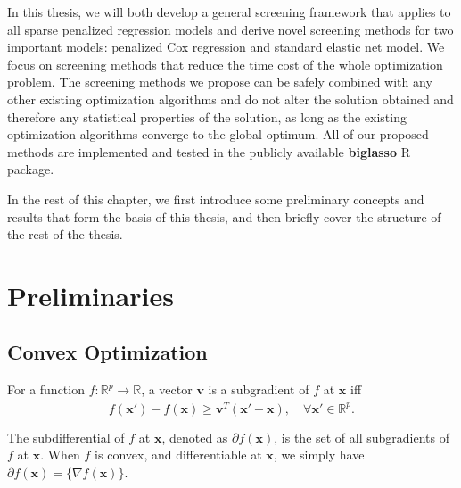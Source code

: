 In this thesis, we will both develop a general screening framework that applies to all sparse penalized regression models and derive novel screening methods for two important models: penalized Cox regression and standard elastic net model. We focus on screening methods that reduce the time cost of the whole optimization problem. The screening methods we propose can be safely combined with any other existing optimization algorithms and do not alter the solution obtained and therefore any statistical properties of the solution, as long as the existing optimization algorithms converge to the global optimum. All of our proposed methods are implemented and tested in the publicly available \textbf{biglasso} R package.

In the rest of this chapter, we first introduce some preliminary concepts and results that form the basis of this thesis, and then briefly cover the structure of the rest of the thesis.

\section{Preliminaries}

\subsection{Convex Optimization}

For a function $f:\mathbb{R}^p\xrightarrow[]{}\mathbb{R}$, a vector $\boldsymbol v$ is a subgradient of $f$ at $\boldsymbol x$ iff
\begin{equation}
    f(\boldsymbol x')-f(\boldsymbol x)\geq \boldsymbol v^T(\boldsymbol x'-\boldsymbol x),\quad\forall \boldsymbol x'\in \mathbb{R}^p.
\end{equation}

The subdifferential of $f$ at $\boldsymbol x$, denoted as $\partial f(\boldsymbol x)$, is the set of all subgradients of $f$ at $\boldsymbol x$. When $f$ is convex, and differentiable at $\boldsymbol x$, we simply have $\partial f(\boldsymbol x)=\{\nabla f(\boldsymbol x)\}$.

